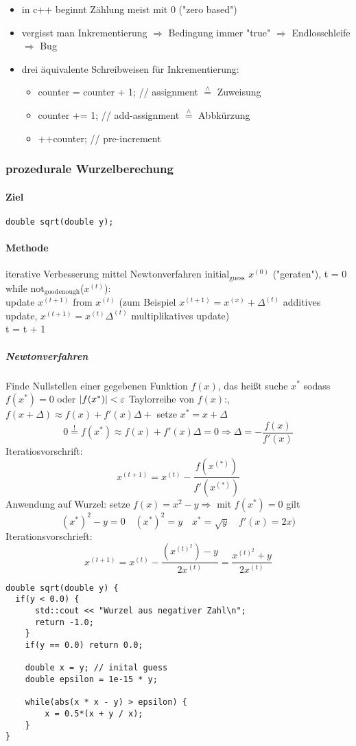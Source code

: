 \documentclass[a4paper]{scrartcl}
\newcommand{\estimates}{\overset{\scriptscriptstyle\wedge}{=}}%
\DeclarePairedDelimiter\abs{\lvert}{\rvert}%
\begin{document}
\begin{itemize}
\item in c++ beginnt Zählung meist mit $0$ ("zero based")
\item vergisst man Inkrementierung $\Rightarrow$ Bedingung immer "true" $\Rightarrow$ Endlosschleife $\Rightarrow$ Bug
\item drei äquivalente Schreibweisen für Inkrementierung:
\begin{itemize}
\item counter = counter + 1; // assignment $\estimates$ Zuweisung
\item counter += 1;          // add-assignment $\estimates$ Abbkürzung
\item ++counter;             // pre-increment
\end{itemize}
\end{itemize}
\subsubsection{prozedurale Wurzelberechung}
\label{sec-9-2-5}
\paragraph{Ziel}
\label{sec-9-2-5-1}
\begin{verbatim}
double sqrt(double y);
\end{verbatim}
\paragraph{Methode}
\label{sec-9-2-5-2}
iterative Verbesserung mittel Newtonverfahren
initial$_{\text{guess}}$ $x^{(0)}$ ("geraten"), t = 0 \\
     while not$_{\text{good}}$$_{\text{enough}}$($x^{(t)}$): \\
         update $x^{(t + 1)}$ from $x^{(t)}$ (zum Beispiel $x^{(t + 1)} = x^{(x)} + \Delta^{(t)}$ additives update, $x^{(t + 1)} = x^{(t)}\Delta^{(t)}$ multiplikatives update) \\
         t = t + 1 \\
\subparagraph{Newtonverfahren}
\label{sec-9-2-5-2-1}
Finde Nullstellen einer gegebenen Funktion $f(x)$, das heißt suche $x^\ast$ sodass $f(x^\ast) = 0$ oder $\abs{f(x^\ast)} < \varepsilon$
Taylorreihe von $f(x)$:, $f(x + \Delta) \approx f(x) + f'(x)\Delta +$ setze $x^\ast = x + \Delta$
\[0 \overset{!}{=} f(x^\ast) \approx f(x) + f'(x)\Delta = 0 \Rightarrow \Delta = - \frac{f(x)}{f'(x)}\]
Iteratiosvorschrift:
\[x^{(t + 1)} = x^{(t)} - \frac{f(x^{(\ast)})}{f'(x^{(\ast)})}\]
Anwendung auf Wurzel: setze $f(x) = x^2 - y \Rightarrow$ mit $f(x^\ast) = 0$ gilt
\[(x^\ast)^2 -y = 0 \quad (x^\ast)^2 = y \quad x^\ast = \sqrt{y}\quad f'(x) = 2x)\]
Iterationsvorschrieft:
\[x^{(t + 1)} = x^{(t)} - \frac{(x^{(t)^2}) - y}{2x^{(t)}} = \frac{x^{(t)^2} + y}{2x^{(t)}}\]
\begin{verbatim}
double sqrt(double y) {
  if(y < 0.0) {
	  std::cout << "Wurzel aus negativer Zahl\n";
	  return -1.0;
	}
	if(y == 0.0) return 0.0;

	double x = y; // inital guess
	double epsilon = 1e-15 * y;

	while(abs(x * x - y) > epsilon) {
		x = 0.5*(x + y / x);
	}
}
\end{verbatim}
\end{document}
